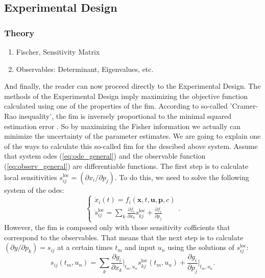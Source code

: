 \documentclass[10pt,A4paper]{article}
\newcommand{\mbx}{\mathbf{x}}
\newcommand{\mbu}{\mathbf{u}}
\newcommand{\mbp}{\mathbf{p}}
\begin{document}
\subsection*{Experimental Design}
\subsubsection*{Theory}
\begin{enumerate}
    \item Fischer, Sensitivity Matrix
    \item Observables: Determinant, Eigenvalues, etc.
\end{enumerate}


And finally, the reader can now proceed directly to the Experimental Design.
The methods of the Experimental Design imply maximizing the objective function calculated using one of the properties of the \ac{fim}.
According to so-called 'Cramer-Rao inequality', the \acl{fim} is inversely proportional to the minimal squared estimation error \cite{friedenExploratoryData2010}. 
So by maximizing the Fisher information we actually can minimize the uncertainty of the parameter estimates.
We are going to explain one of the ways to calculate this so-called \acl{fim} for the descibed above system.
Assume that system \acp{ode} (\ref{eq:ode_general}) and the observable function (\ref{eq:observ_general}) are differentiable functions.
The first step is to calculate local sensitivities $s^\text{loc}_{ij} = (\partial x_i / \partial p_j )$.
To do this, we need to solve the following system of the \acp{ode}:
\begin{equation}
    \begin{cases}
    \dot x_i (t) = f_i(\mbx, t, \mbu, \mbp, c)\\
    \dot s^\text{loc}_{ij} = \sum_k \frac{\partial f_i}{\partial x_k} s^\text{loc}_{kj} + \frac{\partial f_i}{\partial p_j}
    \end{cases}.
\label{eq:ode_and_sensitiv}
\end{equation} 
However, the \ac{fim} is composed only with those sensitivity cofficients that correspond to the observables.
That means that the next step is to calculate $(\partial y / \partial p_k) = s_{ij}$ at a certain times $t_m$ and input $u_n$ using the solutions of $s^\text{loc}_{ij}$:
\begin{equation}
    s_{ij} (t_m, u_n) = \sum_k \frac{\partial g_i}{\partial x_k}\bigg|_{t_m, u_n} s_{kj}^\text{loc} (t_m, u_n) + \frac{\partial g_i}{\partial p_j}\bigg|_{t_m, u_n}.
\label{eq:observ_sensitivities}
\end{equation}
\end{document}
